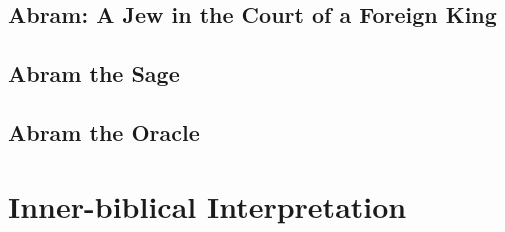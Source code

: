 \hypertarget{abram-a-jew-in-the-court-of-a-foreign-king}{%
\subsection{Abram: A Jew in the Court of a Foreign
King}\label{abram-a-jew-in-the-court-of-a-foreign-king}}

\hypertarget{abram-the-sage}{%
\subsection{Abram the Sage}\label{abram-the-sage}}

\hypertarget{abram-the-oracle}{%
\subsection{Abram the Oracle}\label{abram-the-oracle}}

\hypertarget{inner-biblical-interpretation}{%
\section{Inner-biblical
Interpretation}\label{inner-biblical-interpretation}}
